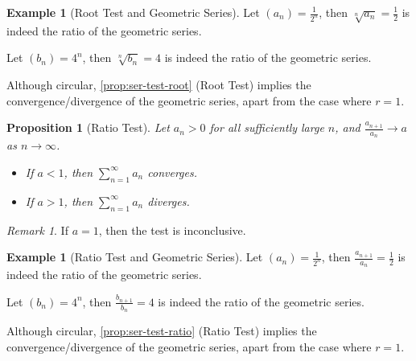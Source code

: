\documentclass[11pt]{article}
\numberwithin{equation}{section}
\newtheorem{proposition}[theorem]{Proposition}
\theoremstyle{definition}
\newtheorem{example}[theorem]{Example}
\theoremstyle{remark}
\newtheorem{remark}[theorem]{Remark}
\newcommand{\pqty}[1]{\left(#1\right)}
\begin{document}
\begin{example}[Root Test and Geometric Series]\label{analysis-unit-0042}
    \label{ex:ser-test-root-geo}%
    Let \(\pqty{a_n} = \frac{1}{2^n}\), then \(\sqrt[n]{a_n} = \frac{1}{2}\) is indeed the ratio of the geometric series.

    Let \(\pqty{b_n} = 4^n\), then \(\sqrt[n]{b_n} = 4\) is indeed the ratio of the geometric series.

    Although circular, \autoref{prop:ser-test-root} (Root Test) implies the convergence/divergence of the geometric series, apart from the case where \(r = 1\).
\end{example}

\begin{proposition}[Ratio Test]\label{analysis-unit-0043}
    \label{prop:ser-test-ratio}%
    Let \(a_n>0\) for all sufficiently large \(n\), and \(\frac{a_{n + 1}}{a_n} \to a\) as \(n \to \infty\).

    \begin{itemize}
        \item If \(a < 1\), then \(\sum_{n = 1}^{\infty} a_n\) converges.
        \item If \(a > 1\), then \(\sum_{n = 1}^{\infty} a_n\) diverges.
    \end{itemize}
\end{proposition}

\begin{remark}\label{analysis-unit-0044}
    If \(a = 1\), then the test is inconclusive.
\end{remark}

\begin{example}[Ratio Test and Geometric Series]\label{analysis-unit-0045}
    \label{ex:ser-test-ratio-geo}%
    Let \(\pqty{a_n} = \frac{1}{2^n}\), then \(\frac{a_{n + 1}}{a_n} = \frac{1}{2}\) is indeed the ratio of the geometric series.

    Let \(\pqty{b_n} = 4^n\), then \(\frac{b_{n + 1}}{b_n} = 4\) is indeed the ratio of the geometric series.

    Although circular, \autoref{prop:ser-test-ratio} (Ratio Test) implies the convergence/divergence of the geometric series, apart from the case where \(r = 1\).
\end{example}
\end{document}

